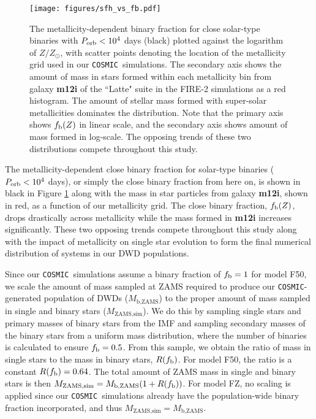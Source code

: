 \documentclass[twocolumn, linenumbers]{aastex631}
\newcommand{\cosmic}{\texttt{COSMIC}}
\begin{document}
\begin{figure}
	\texttt{[image: figures/sfh\_vs\_fb.pdf]}
    \caption{The metallicity-dependent binary fraction for close solar-type binaries with \textbf{$P_{\rm{orb}}< 10^4$} days (black) plotted against the logarithm of $Z/Z_\odot$, with scatter points denoting the location of the metallicity grid used in our \cosmic\ simulations. The secondary axis shows the amount of mass in stars formed within each metallicity bin from galaxy \textbf{m12i} of the ``Latte" suite in the FIRE-2 simulations as a red histogram. The amount of stellar mass formed with super-solar metallicities dominates the distribution. Note that the primary axis shows $f_{\rm{b}}(Z)$ in linear scale, and the secondary axis shows amount of mass formed in log-scale. The opposing trends of these two distributions compete throughout this study.}
    \label{fig:sfh_vs_fb}
\end{figure}

The metallicity-dependent close binary fraction for solar-type binaries ($P_{\rm{orb}} < 10^4$ days), or simply the close binary fraction from here on, is shown in black in Figure \ref{fig:sfh_vs_fb} along with the mass in star particles from galaxy \textbf{m12i}, shown in red, as a function of our metallicity grid. The close binary fraction, \textbf{$f_{\rm{b}}(Z)$}, drops drastically across metallicity while the mass formed in \textbf{m12i} increases significantly. These two opposing trends compete throughout this study along with the impact of metallicity on single star evolution to form the final numerical distribution of systems in our DWD populations. 

Since our \cosmic\ simulations assume a binary fraction of $f_{\rm{b}} = 1$ for model F50, we scale the amount of mass sampled at ZAMS required to produce our \cosmic-generated population of DWDs ($M_{\text{b,ZAMS}}$) to the proper amount of mass sampled in single and binary stars ($M_{\text{ZAMS,sim}}$). We do this by sampling single stars and primary masses of binary stars from the \cite{Kroupa2001} IMF and sampling secondary masses of the binary stars from a uniform mass distribution, where the number of binaries is calculated to ensure $f_{\rm{b}}=0.5$. From this sample, we obtain the ratio of mass in single stars to the mass in binary stars, $R(f_{\rm{b}})$. For model F50, the ratio is a constant $R(f_{\rm{b}}) = 0.64$. The total amount of ZAMS mass in single and binary stars is then $M_{\text{ZAMS,sim}} =  M_{\text{b,ZAMS}} (1 + R(f_{\rm{b}}))$. For model FZ, no scaling is applied since our \cosmic\ simulations already have the population-wide binary fraction incorporated, and thus $M_{\text{ZAMS,sim}} =  M_{\text{b,ZAMS}}$. 
\end{document}
